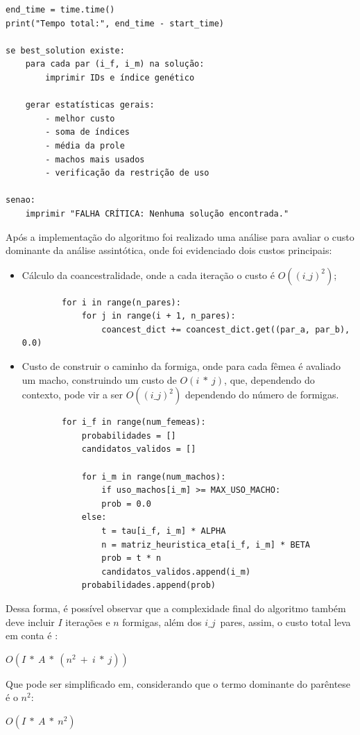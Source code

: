 \begin{verbatim}
end_time = time.time()
print("Tempo total:", end_time - start_time)

se best_solution existe:
    para cada par (i_f, i_m) na solução:
        imprimir IDs e índice genético

    gerar estatísticas gerais:
        - melhor custo
        - soma de índices
        - média da prole
        - machos mais usados
        - verificação da restrição de uso

senao:
    imprimir "FALHA CRÍTICA: Nenhuma solução encontrada."
\end{verbatim}

Após a implementação do algoritmo foi realizado uma análise para avaliar o custo dominante da análise assintótica, onde foi evidenciado dois custos principais:
\begin{itemize}
    \item Cálculo da coancestralidade, onde a cada iteração o custo é \(O((i\_j)^2)\);
    \begin{verbatim}
        for i in range(n_pares):
            for j in range(i + 1, n_pares):
                coancest_dict += coancest_dict.get((par_a, par_b), 0.0)
    \end{verbatim}
    \item Custo de construir o caminho da formiga, onde para cada fêmea é avaliado um macho, construindo um custo de \(O(i\ *\ j)\), que, dependendo do contexto, pode vir a ser \(O((i\_j)^2)\) dependendo do número de formigas.
    \begin{verbatim}
        for i_f in range(num_femeas):
            probabilidades = []
            candidatos_validos = []

            for i_m in range(num_machos):
                if uso_machos[i_m] >= MAX_USO_MACHO:
                prob = 0.0
            else:
                t = tau[i_f, i_m] * ALPHA
                n = matriz_heuristica_eta[i_f, i_m] * BETA
                prob = t * n
                candidatos_validos.append(i_m)
            probabilidades.append(prob)
    \end{verbatim}
\end{itemize}
Dessa forma, é possível observar que a complexidade final do algoritmo também deve incluir \(I\) iterações e \(n\) formigas, além dos \(i\_j\)\ pares, assim, o custo total leva em conta é :

\begin{center}
    \(O(I\ *\ A\ *\ (n^2\ +\ i\ *\ j))\)
\end{center} 
Que pode ser simplificado em, considerando que o termo dominante do parêntese é o \(n^2\):
\begin{center}
    \(O(I\ *\ A\ *\ n^2)\)
\end{center}
\vspace{1em}
